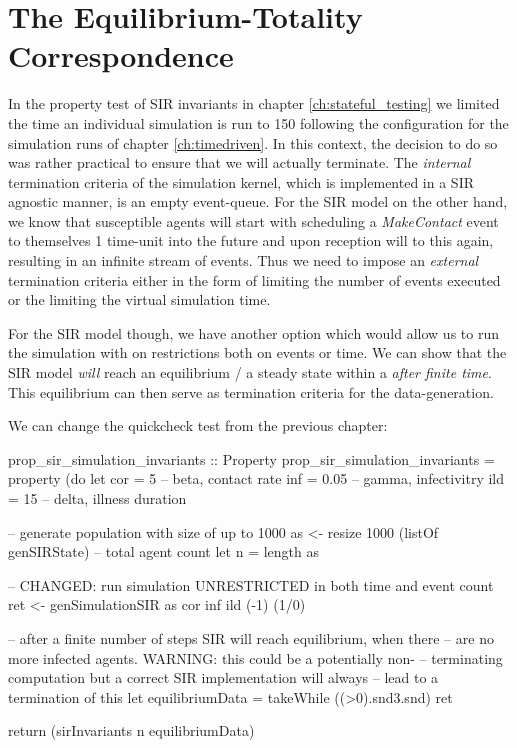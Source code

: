 \chapter{The Equilibrium-Totality Correspondence}
\label{ch:equilibrium_totality}

In the property test of SIR invariants in chapter \ref{ch:stateful_testing} we limited the time an individual simulation is run to 150 following the configuration for the simulation runs of chapter \ref{ch:timedriven}. In this context, the decision to do so was rather practical to ensure that we will actually terminate. The \textit{internal} termination criteria of the simulation kernel, which is implemented in a SIR agnostic manner, is an empty event-queue. For the SIR model on the other hand, we know that susceptible agents will start with scheduling a \textit{MakeContact} event to themselves 1 time-unit into the future and upon reception will to this again, resulting in an infinite stream of events. Thus we need to impose an \textit{external} termination criteria either in the form of limiting the number of events executed or the limiting the virtual simulation time.

For the SIR model though, we have another option which would allow us to run the simulation with on restrictions both on events or time. We can show that the SIR model \textit{will} reach an equilibrium / a steady state within a \textit{after finite time}. This equilibrium can then serve as termination criteria for the data-generation.

We can change the quickcheck test from the previous chapter:

\begin{HaskellCode}
prop_sir_simulation_invariants :: Property
prop_sir_simulation_invariants = property (do
  let cor = 5     -- beta, contact rate
      inf = 0.05  -- gamma, infectivitry
      ild = 15    -- delta, illness duration

  -- generate population with size of up to 1000
  as <- resize 1000 (listOf genSIRState)
  -- total agent count
  let n = length as
  
  -- CHANGED: run simulation UNRESTRICTED in both time and event count
  ret <- genSimulationSIR as cor inf ild (-1) (1/0)
  
  -- after a finite number of steps SIR will reach equilibrium, when there
  -- are no more infected agents. WARNING: this could be a potentially non-
  -- terminating computation but a correct SIR implementation will always
  -- lead to a termination of this 
  let equilibriumData = takeWhile ((>0).snd3.snd) ret

  return (sirInvariants n equilibriumData)
\end{HaskellCode}

